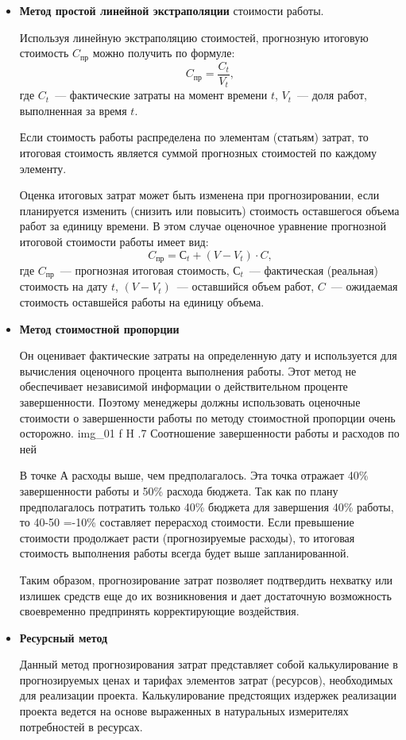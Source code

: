 \begin{itemize}
	\item \textbf{Метод простой линейной экстраполяции} стоимости работы.
	
	Используя линейную экстраполяцию стоимостей, прогнозную итоговую стоимость $C_{пр}$ можно получить по формуле:
	\begin{equation} 
		C_{\text{пр}} = \frac{C_t}{V_t}, 
	\end{equation}
	где $C_{t}$~--- фактические затраты на момент времени $t$, $V_{t}$~--- доля работ, выполненная за время $t$.
	
	Если стоимость работы распределена по элементам (статьям) затрат, то итоговая стоимость является суммой прогнозных стоимостей по каждому элементу.
	
	Оценка итоговых затрат может быть изменена при прогнозировании, если планируется изменить (снизить или повысить) стоимость оставшегося объема работ за единицу времени. 
	В этом случае оценочное уравнение прогнозной итоговой стоимости работы имеет вид:
	\begin{equation}
		C_{\text{пр}} = С_{t} + (V - V_{t}) \cdot C,
	\end{equation}
	где $C_{\text{пр}}$~--- прогнозная итоговая стоимость, $С_{t}$~--- фактическая (реальная) стоимость на дату $t$, $(V - V_{t})$~--- оставшийся объем работ, $C$~--- ожидаемая стоимость оставшейся работы на единицу объема.
	
	\item \textbf{Метод стоимостной пропорции}
	
	Он оценивает фактические затраты на определенную дату и используется для вычисления оценочного процента выполнения работы. 
	Этот метод не обеспечивает независимой информации о действительном проценте завершенности. 
	Поэтому менеджеры должны использовать оценочные стоимости о завершенности работы по методу стоимостной пропорции очень осторожно.
	{img_01}
	{f}
	{H}
	{.7\textwidth}
	{Соотношение завершенности работы и расходов по ней}
	
	В точке А расходы выше, чем предполагалось. 
	Эта точка отражает 40\% завершенности работы и 50\% расхода бюджета. 
	Так как по плану предполагалось потратить только 40\% бюджета для завершения 40\% работы, то 40-50 =-10\% составляет перерасход стоимости. 
	Если превышение стоимости продолжает расти (прогнозируемые расходы), то итоговая стоимость выполнения работы всегда будет выше запланированной.
	
	Таким образом, прогнозирование затрат позволяет подтвердить нехватку или излишек средств еще до их возникновения и дает достаточную возможность своевременно предпринять корректирующие воздействия.
	
	\item \textbf{Ресурсный метод} 
	
	Данный метод прогнозирования затрат представляет собой калькулирование в прогнозируемых ценах и тарифах элементов затрат (ресурсов), необходимых для реализации проекта. Калькулирование предстоящих издержек реализации проекта ведется на основе выраженных в натуральных измерителях потребностей в ресурсах.
\end{itemize}

